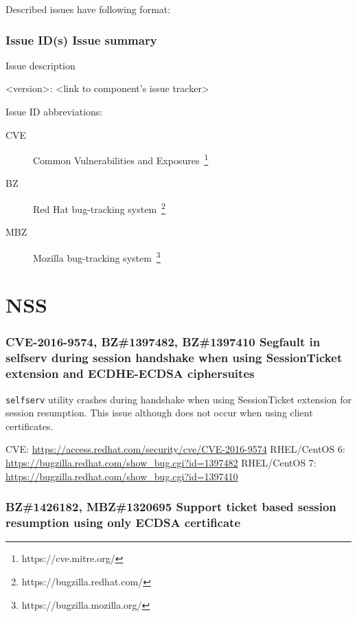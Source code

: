     \bigskip\noindent Described issues have following format:

    \subsubsection*{Issue ID(s)  \newline Issue summary}
    Issue description

    \medskip\noindent <version>: <link to component's issue tracker>

    \bigskip\noindent Issue ID abbreviations:
    \begin{description}
        \item[CVE] Common Vulnerabilities and Exposures~\footnote{https://cve.mitre.org/}
        \item[BZ] Red Hat bug-tracking system~\footnote{https://bugzilla.redhat.com/}
        \item[MBZ] Mozilla bug-tracking system~\footnote{https://bugzilla.mozilla.org/}
    \end{description}

\section{NSS}
\subsubsection*{{\color{red} CVE-2016-9574}, BZ\#1397482, BZ\#1397410  \newline
    Segfault in selfserv during session handshake when using SessionTicket
    extension and ECDHE-ECDSA ciphersuites}

    \texttt{selfserv} utility crashes during handshake when using SessionTicket
    extension for session resumption. This issue although does not occur when
    using client certificates.

    \medskip\noindent CVE: \url{https://access.redhat.com/security/cve/CVE-2016-9574}
    \newline\noindent RHEL/CentOS 6: \url{https://bugzilla.redhat.com/show_bug.cgi?id=1397482}
    \newline\noindent RHEL/CentOS 7: \url{https://bugzilla.redhat.com/show_bug.cgi?id=1397410}

\subsubsection*{BZ\#1426182, MBZ\#1320695  \newline
    Support ticket based session resumption using only ECDSA certificate}

